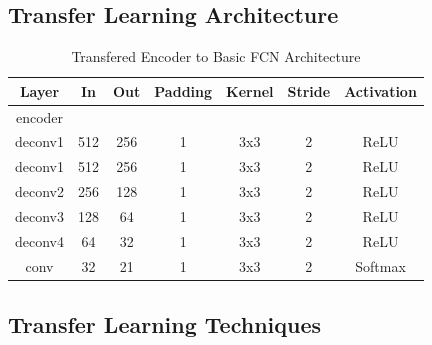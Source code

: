 \subsection*{Transfer Learning Architecture}
\begin{table}[H]
	\centering
	\label{tab:transfer}
	\setlength{\abovecaptionskip}{10pt}
	\begin{tabular}{|c|c|c|c|c|c|c|}
		\hline
		\textbf{Layer} & \textbf{In} & \textbf{Out} & \textbf{Padding} & \textbf{Kernel} & \textbf{Stride} & \textbf{Activation} \\ \hline
		encoder          &            &            &                 &              &                &                 \\ \hline
		deconv1        & 512         & 256           & 1                & 3x3             & 2               & ReLU                \\ \hline
		deconv1        & 512         & 256           & 1                & 3x3             & 2               & ReLU                \\ \hline
		deconv2        & 256         & 128           & 1                & 3x3             & 2               & ReLU                \\ \hline
		deconv3        & 128         & 64           & 1                & 3x3             & 2               & ReLU                \\ \hline
		deconv4        & 64         & 32           & 1                & 3x3             & 2               & ReLU                \\ \hline
		conv        & 32         & 21           & 1                & 3x3             & 2               & Softmax                \\ \hline
	\end{tabular}
	\caption{Transfered Encoder to Basic FCN Architecture}
\end{table}

\subsection*{Transfer Learning Techniques}

